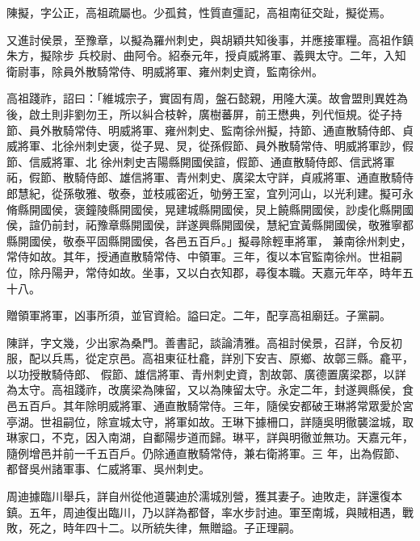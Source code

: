 
\begin{pinyinscope}

 陳擬，字公正，高祖疏屬也。少孤貧，性質直彊記，高祖南征交趾，擬從焉。



 又進討侯景，至豫章，以擬為羅州刺史，與胡穎共知後事，并應接軍糧。高祖作鎮朱方，擬除步
 兵校尉、曲阿令。紹泰元年，授貞威將軍、義興太守。二年，入知衛尉事，除員外散騎常侍、明威將軍、雍州刺史資，監南徐州。



 高祖踐祚，詔曰：「維城宗子，實固有周，盤石懿親，用隆大漢。故會盟則異姓為後，啟土則非劉勿王，所以糾合枝幹，廣樹蕃屏，前王懋典，列代恒規。從子持節、員外散騎常侍、明威將軍、雍州刺史、監南徐州擬，持節、通直散騎侍郎、貞威將軍、北徐州刺史褒，從子晃、炅，從孫假節、員外散騎常侍、明威將軍訬，假節、信威將軍、北
 徐州刺史吉陽縣開國侯諠，假節、通直散騎侍郎、信武將軍祏，假節、散騎侍郎、雄信將軍、青州刺史、廣梁太守詳，貞戚將軍、通直散騎侍郎慧紀，從孫敬雅、敬泰，並枝戚密近，劬勞王室，宜列河山，以光利建。擬可永脩縣開國侯，褒鐘陵縣開國侯，晃建城縣開國侯，炅上饒縣開國侯，訬虔化縣開國侯，諠仍前封，祏豫章縣開國侯，詳遂興縣開國侯，慧紀宜黃縣開國侯，敬雅寧都縣開國侯，敬泰平固縣開國侯，各邑五百戶。」擬尋除輕車將軍，
 兼南徐州刺史，常侍如故。其年，授通直散騎常侍、中領軍。三年，復以本官監南徐州。世祖嗣位，除丹陽尹，常侍如故。坐事，又以白衣知郡，尋復本職。天嘉元年卒，時年五十八。



 贈領軍將軍，凶事所須，並官資給。謚曰定。二年，配享高祖廟廷。子黨嗣。



 陳詳，字文幾，少出家為桑門。善書記，談論清雅。高祖討侯景，召詳，令反初服，配以兵馬，從定京邑。高祖東征杜龕，詳別下安吉、原鄉、故鄣三縣。龕平，以功授散騎侍郎、
 假節、雄信將軍、青州刺史資，割故鄣、廣德置廣梁郡，以詳為太守。高祖踐祚，改廣梁為陳留，又以為陳留太守。永定二年，封遂興縣侯，食邑五百戶。其年除明威將軍、通直散騎常侍。三年，隨侯安都破王琳將常眾愛於宮亭湖。世祖嗣位，除宣城太守，將軍如故。王琳下據柵口，詳隨吳明徹襲湓城，取琳家口，不克，因入南湖，自鄱陽步道而歸。琳平，詳與明徹並無功。天嘉元年，隨例增邑并前一千五百戶。仍除通直散騎常侍，兼右衛將軍。三
 年，出為假節、都督吳州諸軍事、仁威將軍、吳州刺史。



 周迪據臨川舉兵，詳自州從他道襲迪於濡城別營，獲其妻子。迪敗走，詳還復本鎮。五年，周迪復出臨川，乃以詳為都督，率水步討迪。軍至南城，與賊相遇，戰敗，死之，時年四十二。以所統失律，無贈謚。子正理嗣。




\end{pinyinscope}
